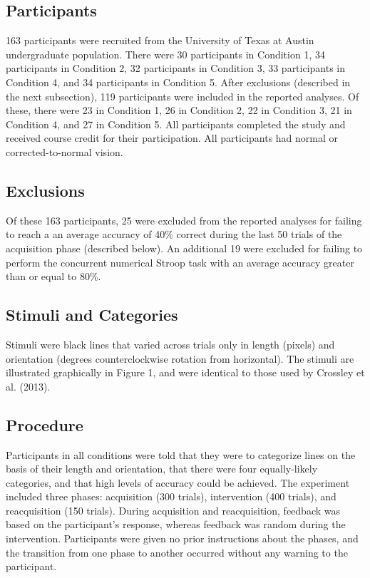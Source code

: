 \documentclass[man,apacite,draftfirst]{apa6}
\begin{document}
\subsection*{Participants} 163 participants were recruited from the University
of Texas at Austin undergraduate population. There were 30 participants in
Condition 1, 34 participants in Condition 2, 32 participants in Condition 3, 33
participants in Condition 4, and 34 participants in Condition 5. After
exclusions (described in the next subsection), 119 participants were included in
the reported analyses. Of these, there were 23 in Condition 1, 26 in Condition
2, 22 in Condition 3, 21 in Condition 4, and 27 in Condition 5. All participants
completed the study and received course credit for their participation. All
participants had normal or corrected-to-normal vision.

\subsection*{Exclusions}
Of these 163 participants, 25 were excluded from the reported analyses for
failing to reach a an average accuracy of 40\% correct during the last 50 trials
of the acquisition phase (described below). An additional 19 were excluded for
failing to perform the concurrent numerical Stroop task with an average accuracy
greater than or equal to 80\%.

\subsection*{Stimuli and Categories} Stimuli were black lines that varied across
trials only in length (pixels) and orientation (degrees counterclockwise
rotation from horizontal). The stimuli are illustrated graphically in Figure 1,
and were identical to those used by Crossley et al. (2013).

\subsection{Procedure} Participants in all conditions were told that they were
to categorize lines on the basis of their length and orientation, that there
were four equally-likely categories, and that high levels of accuracy could be
achieved. The experiment included three phases: acquisition (300 trials),
intervention (400 trials), and reacquisition (150 trials). During acquisition
and reacquisition, feedback was based on the participant's response, whereas
feedback was random during the intervention. Participants were given no prior
instructions about the phases, and the transition from one phase to another
occurred without any warning to the participant.
\end{document}
